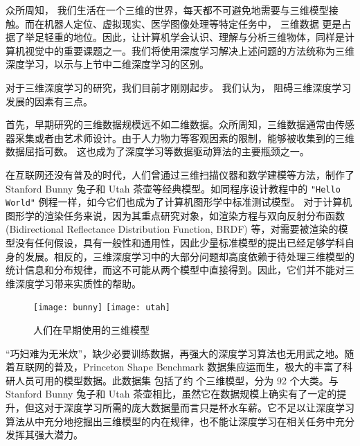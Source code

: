 众所周知，
我们生活在一个三维的世界，每天都不可避免地需要与三维模型接触。而在机器人定位、虚拟现实、医学图像处理等特定任务中，
三维数据%
更是占据了举足轻重的地位。因此，让计算机学会认识、理解与分析三维物体，同样是计算机视觉中的重要课题之一。我们将使用深度学习解决上述问题的方法统称为三维深度学习，以示与上节中二维深度学习的区别。

对于三维深度学习的研究，我们目前才刚刚起步。
我们认为，
阻碍三维深度学习发展的因素有三点。




首先，早期研究的三维数据规模远不如二维数据。众所周知，三维数据通常由传感器采集或者由艺术师设计。由于人力物力等客观因素的限制，能够被收集到的三维数据屈指可数。
这也成为了深度学习等数据驱动算法的主要瓶颈之一。

在互联网还没有普及的时代，人们曾通过三维扫描仪器和数学建模等方法，制作了 Stanford Bunny 兔子和 Utah 茶壶等经典模型。如同程序设计教程中的 \texttt{"Hello World"} 例程一样，如今它们也成为了计算机图形学中标准测试模型。
对于计算机图形学的渲染任务来说，因为其重点研究对象，如渲染方程\cite{renderequ}与双向反射分布函数 (Bidirectional Reflectance Distribution Function, BRDF)\cite{phong, blinnphong} 等，对需要被渲染的模型没有任何假设，具有一般性和通用性，因此少量标准模型的提出已经足够学科自身的发展。相反的，三维深度学习中的大部分问题却高度依赖于待处理三维模型的统计信息和分布规律，而这不可能从两个模型中直接得到。因此，它们并不能对三维深度学习带来实质性的帮助。


\begin{figure}[h]
	\centering%
	{\texttt{[image: bunny]}}%
	\hspace{2em}%
	{\texttt{[image: utah]}}
	\caption{人们在早期使用的三维模型}
\end{figure}


“巧妇难为无米炊”，缺少必要训练数据，再强大的深度学习算法也无用武之地。随着互联网的普及，Princeton Shape Benchmark 数据集\cite{princetonShapeBenchmark}应运而生，极大的丰富了科研人员可用的模型数据。此数据集 包括了约  个三维模型，分为 92 个大类。与 Stanford Bunny 兔子和 Utah 茶壶相比，虽然它在数据规模上确实有了一定的提升，但这对于深度学习所需的庞大数据量而言只是杯水车薪。它不足以让深度学习算法从中充分地挖掘出三维模型的内在规律，也不能让深度学习在相关任务中充分发挥其强大潜力。

